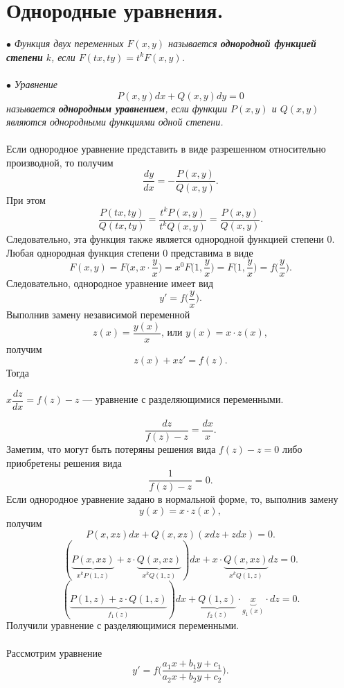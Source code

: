 \documentclass[a4paper, 12pt]{report}
\begin{document}
\section{Однородные уравнения.}
	$\bullet$ \textit{Функция двух переменных $F(x,y)$ называется \textbf{однородной функцией степени} $k$, если $F(tx,ty) = t^kF(x,y)$.}\\\\
	$\bullet$ \textit{Уравнение $$P(x,y)dx + Q(x,y)dy = 0$$ называется \textbf{однородным уравнением}, если функции $P(x,y)$ и $Q(x,y)$ являются однородными функциями одной степени.}\\\\
	Если однородное уравнение представить в виде разрешенном относительно производной, то получим $$\dfrac{dy}{dx} = -\dfrac{P(x,y)}{Q(x,y)}.$$
	При этом $$\dfrac{P(tx,ty)}{Q(tx,ty)} = \dfrac{t^kP(x,y)}{t^kQ(x,y)} = \dfrac{P(x,y)}{Q(x,y)}.$$
	Следовательно, эта функция также является однородной функцией степени 0. Любая однородная функция степени 0 представима в виде $$F(x,y) = F\Big(x,x\cdot \dfrac{y}{x}\Big) = x^0F\Big(1, \dfrac{y}{x}\Big) =F\Big(1,\dfrac{y}{x}\Big) = f\Big(\dfrac{y}{x}\Big).$$
	Следовательно, однородное уравнение имеет вид $$y' = f\Big(\dfrac{y}{x}\Big).$$
	Выполнив замену независимой переменной $$z(x) = \dfrac{y(x)}{x}\text{, или }y(x) = x\cdot z(x),$$ получим $$z(x) + xz' = f(z).$$
	Тогда \begin{center}
		$x\dfrac{dz}{dx} = f(z) - z$ --- уравнение с разделяющимися переменными.
	\end{center}
	$$\dfrac{dz}{f(z) - z} = \dfrac{dx}{x}.$$
	Заметим, что могут быть потеряны решения вида $f(z) - z = 0$ либо приобретены решения вида $$\dfrac{1}{f(z) - z} = 0.$$
	Если однородное уравнение задано в нормальной форме, то, выполнив замену $$y(x) = x\cdot z(x),$$ получим $$P(x,xz)dx + Q(x,xz) (xdz + zdx) = 0.$$
	$$(\underbrace{P(x,xz)}_{x^kP(1,z)} + z\cdot \underbrace{Q(x,xz)}_{x^kQ(1,z)})dx +x\cdot  \underbrace{Q(x,xz)}_{x^kQ(1,z)}dz = 0.$$
	$$(\underbrace{P(1,z) + z\cdot Q(1,z)}_{f_1(z)})dx + \underbrace{Q(1,z)}_{f_2(z)}\cdot \underbrace{x}_{g_1(x)}\cdot dz = 0.$$
	Получили уравнение с разделяющимися переменными.\\\\
Рассмотрим уравнение  $$y' = f\Big(\dfrac{a_1x + b_1y + c_1}{a_2 x + b_2y + c_2}\Big).$$
\end{document}
